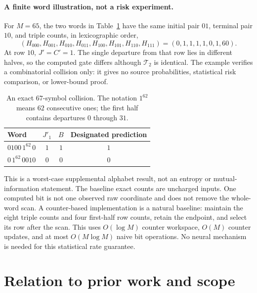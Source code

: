 \documentclass[11pt,letterpaper]{article}
\newcommand{\cT}{\mathcal T}
\theoremstyle{definition}
\theoremstyle{remark}
\numberwithin{equation}{section}
\begin{document}
\paragraph{A finite word illustration, not a risk experiment.}
For $M=65$, the two words in Table~\ref{tab:words} have the same initial pair $01$, terminal pair $10$, and triple counts, in lexicographic order,
\[
 (H_{000},H_{001},H_{010},H_{011},H_{100},H_{101},H_{110},H_{111})
 =(0,1,1,1,1,0,1,60).
\]
At row $10$, $J'=C'=1$. The single departure from that row lies in different halves, so the computed gate differs although $\cT_2$ is identical. The example verifies a combinatorial collision only: it gives no source probabilities, statistical risk comparison, or lower-bound proof.
\begin{table}[ht]
\centering
\caption{An exact $67$-symbol collision. The notation $1^{62}$ means $62$ consecutive ones; the first half contains departures $0$ through $31$.}\label{tab:words}
\begin{tabular}{lccc}
\toprule
Word & $J'_1$ & $B$ & Designated prediction\\
\midrule
$0100\,1^{62}\,0$ & $1$ & $1$ & $1$\\
$0\,1^{62}\,0010$ & $0$ & $0$ & $0$\\
\bottomrule
\end{tabular}
\end{table}

This is a worst-case supplemental alphabet result, not an entropy or mutual-information statement. The baseline exact counts are uncharged inputs. One computed bit is not one observed raw coordinate and does not remove the whole-word scan. A counter-based implementation is a natural baseline: maintain the eight triple counts and four first-half row counts, retain the endpoint, and select its row after the scan. This uses $O(\log M)$ counter workspace, $O(M)$ counter updates, and at most $O(M\log M)$ naive bit operations. No neural mechanism is needed for this statistical rate guarantee.

\section{Relation to prior work and scope}\label{sec:related}
\end{document}
